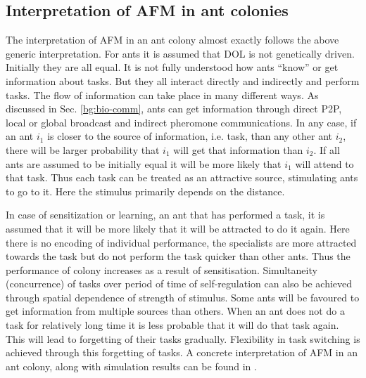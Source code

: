  \subsection{Interpretation of AFM  in ant colonies}
 The interpretation of AFM in an ant colony almost exactly follows the above generic interpretation. For ants it is assumed that DOL is not genetically driven. Initially they are all equal. It is not fully understood how ants ``know'' or get information about tasks. But  they all interact directly and indirectly and perform tasks. The flow of information can take place in many different ways. As discussed in Sec. \ref{bg:bio-comm}, ants can get information through direct P2P, local or global broadcast and indirect pheromone communications. In any case, if an ant $i_{1}$ is closer to the source of information, i.e. task, than any other ant $i_{2}$, there will be larger probability that $i_{1}$ will get that information than $i_{2}$. If all ants are assumed to be initially equal it will be more likely that  $i_{1}$ will attend to that task. Thus each task can be  treated as an attractive source,  stimulating ants to go to it. Here the stimulus primarily depends on the distance.

In case of sensitization or learning, an ant that has performed a task, it is assumed that it will be more likely that it will be attracted to do it again. Here there is no encoding of individual performance, the specialists are more attracted towards the task but do not perform  the task quicker than other ants. Thus the performance of colony increases as a result of sensitisation. Simultaneity (concurrence) of tasks over period of time of self-regulation can also be achieved through spatial dependence of strength of stimulus. Some ants will be favoured to get information from multiple sources than others. When an ant does not do a task for relatively long time it is less probable that it will do that task again. This will lead to forgetting of their tasks gradually. Flexibility in task switching is achieved through this forgetting of tasks. A concrete interpretation of AFM in an ant colony, along with simulation results can be found in .

